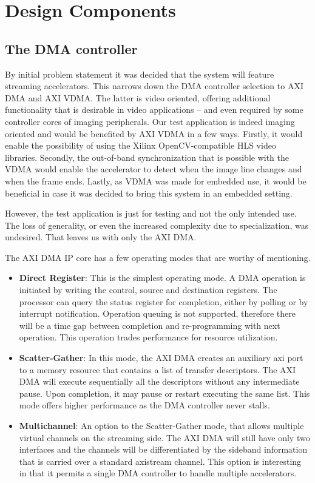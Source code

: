 \section{Design Components}

\subsection{The DMA controller}
\label{sec:axidma}

By initial problem statement it was decided that the system will feature
streaming accelerators. This narrows down the DMA controller selection
to AXI DMA and AXI VDMA. The latter is video oriented, offering additional
functionality that is desirable in video applications -- and even required
by some controller cores of imaging peripherals. Our test application
is indeed imaging oriented and would be benefited by AXI VDMA in a few ways.
Firstly, it would enable the possibility of using the Xilinx OpenCV-compatible
HLS video libraries. Secondly, the out-of-band synchronization that is possible
with the VDMA would enable the accelerator to detect when the image line changes
and when the frame ends. Lastly, as VDMA was made for embedded use, it would be
beneficial in case it was decided to bring this system in an embedded setting.

However, the test application is just for testing and not the only intended use.
The loss of generality, or even the increased complexity due to specialization,
was undesired. That leaves us with only the AXI DMA.

The AXI DMA IP core has a few operating modes that are worthy of mentioning.

\begin{itemize}
\item	\textbf{Direct Register}:
	This is the simplest operating mode. A DMA operation is initiated
	by writing the control, source and destination registers.
	The processor can query the status register for completion,
	either by polling or by interrupt notification.
	Operation queuing is not supported, therefore there will be a time gap
	between completion and re-programming with next operation.
	This operation trades performance for resource utilization.
\item	\textbf{Scatter-Gather}:
	In this mode, the AXI DMA creates an auxiliary \gls{axi} port
	to a memory resource that contains a list of transfer descriptors.
	The AXI DMA will execute sequentially all the descriptors without
	any intermediate pause. Upon completion, it may pause or restart
	executing the same list. This mode offers higher performance
	as the DMA controller never stalls.
\item	\textbf{Multichannel}:
	An option to the Scatter-Gather mode,
	that allows multiple virtual channels on the streaming side.
	The AXI DMA will still have only two interfaces and the channels
	will be differentiated by the sideband information that is carried
	over a standard \gls{axistream} channel. This option is interesting
	in that it permits a single DMA controller to handle multiple accelerators.
\end{itemize}

